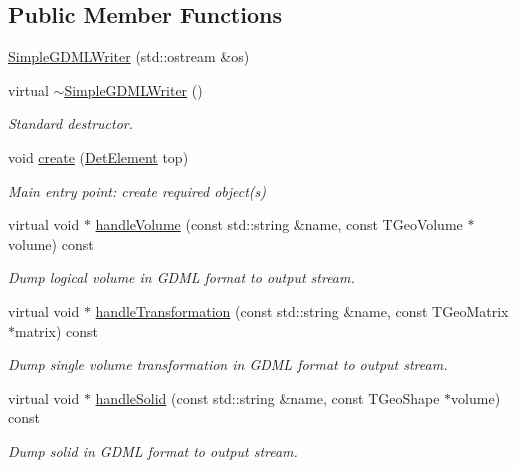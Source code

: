 \subsection*{Public Member Functions}
\begin{DoxyCompactItemize}
\item 
\hyperlink{class_d_d4hep_1_1_geometry_1_1_simple_g_d_m_l_writer_a15eda8337c0e6b902ca91bd3cf5dd9a0}{Simple\+G\+D\+M\+L\+Writer} (std\+::ostream \&os)
\item 
virtual \hyperlink{class_d_d4hep_1_1_geometry_1_1_simple_g_d_m_l_writer_ae3b2fd4273d79d7e59526531da0e9b96}{$\sim$\+Simple\+G\+D\+M\+L\+Writer} ()
\begin{DoxyCompactList}\small\item\em Standard destructor. \end{DoxyCompactList}\item 
void \hyperlink{class_d_d4hep_1_1_geometry_1_1_simple_g_d_m_l_writer_a0ccf6cfb7ec9346ee6e5bba56f2a151a}{create} (\hyperlink{class_d_d4hep_1_1_geometry_1_1_det_element}{Det\+Element} top)
\begin{DoxyCompactList}\small\item\em Main entry point\+: create required object(s) \end{DoxyCompactList}\item 
virtual void $\ast$ \hyperlink{class_d_d4hep_1_1_geometry_1_1_simple_g_d_m_l_writer_a1374f3118e46fea905442b228419c16d}{handle\+Volume} (const std\+::string \&name, const T\+Geo\+Volume $\ast$volume) const
\begin{DoxyCompactList}\small\item\em Dump logical volume in G\+D\+ML format to output stream. \end{DoxyCompactList}\item 
virtual void $\ast$ \hyperlink{class_d_d4hep_1_1_geometry_1_1_simple_g_d_m_l_writer_af4795983d3ea8305dee28d5f7238054a}{handle\+Transformation} (const std\+::string \&name, const T\+Geo\+Matrix $\ast$matrix) const
\begin{DoxyCompactList}\small\item\em Dump single volume transformation in G\+D\+ML format to output stream. \end{DoxyCompactList}\item 
virtual void $\ast$ \hyperlink{class_d_d4hep_1_1_geometry_1_1_simple_g_d_m_l_writer_a9b5b31b1ed94f429a53665ddaabcd80d}{handle\+Solid} (const std\+::string \&name, const T\+Geo\+Shape $\ast$volume) const
\begin{DoxyCompactList}\small\item\em Dump solid in G\+D\+ML format to output stream. \end{DoxyCompactList}\item 

\end{DoxyCompactItemize}
